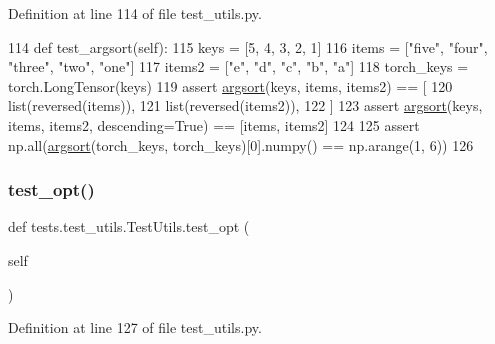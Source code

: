 Definition at line 114 of file test\+\_\+utils.\+py.


\begin{DoxyCode}
114     \textcolor{keyword}{def }test\_argsort(self):
115         keys = [5, 4, 3, 2, 1]
116         items = [\textcolor{stringliteral}{"five"}, \textcolor{stringliteral}{"four"}, \textcolor{stringliteral}{"three"}, \textcolor{stringliteral}{"two"}, \textcolor{stringliteral}{"one"}]
117         items2 = [\textcolor{stringliteral}{"e"}, \textcolor{stringliteral}{"d"}, \textcolor{stringliteral}{"c"}, \textcolor{stringliteral}{"b"}, \textcolor{stringliteral}{"a"}]
118         torch\_keys = torch.LongTensor(keys)
119         \textcolor{keyword}{assert} \hyperlink{namespaceparlai_1_1agents_1_1legacy__agents_1_1seq2seq_1_1utils__v1_a1521e559b740f741ebb47b8755202bb2}{argsort}(keys, items, items2) == [
120             list(reversed(items)),
121             list(reversed(items2)),
122         ]
123         \textcolor{keyword}{assert} \hyperlink{namespaceparlai_1_1agents_1_1legacy__agents_1_1seq2seq_1_1utils__v1_a1521e559b740f741ebb47b8755202bb2}{argsort}(keys, items, items2, descending=\textcolor{keyword}{True}) == [items, items2]
124 
125         \textcolor{keyword}{assert} np.all(\hyperlink{namespaceparlai_1_1agents_1_1legacy__agents_1_1seq2seq_1_1utils__v1_a1521e559b740f741ebb47b8755202bb2}{argsort}(torch\_keys, torch\_keys)[0].numpy() == np.arange(1, 6))
126 
\end{DoxyCode}
\mbox{\label{classtests_1_1test__utils_1_1TestUtils_a595e1217b715af6a4670ee244c9aa61f}} 
\subsubsection{\texorpdfstring{test\+\_\+opt()}{test\_opt()}}
{\footnotesize\ttfamily def tests.\+test\+\_\+utils.\+Test\+Utils.\+test\+\_\+opt (\begin{DoxyParamCaption}\item[{}]{self }\end{DoxyParamCaption})}



Definition at line 127 of file test\+\_\+utils.\+py.


